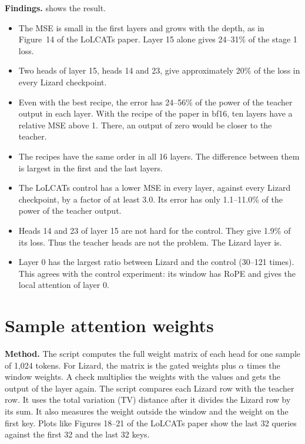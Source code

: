 \textbf{Findings.}  shows the result.
\begin{itemize}
\item The MSE is small in the first layers and grows with the depth, as in Figure~14 of the LoLCATs paper. Layer 15 alone gives 24--31\% of the stage 1 loss.
\item Two heads of layer 15, heads 14 and 23, give approximately 20\% of the loss in every Lizard checkpoint.
\item Even with the best recipe, the error has 24--56\% of the power of the teacher output in each layer. With the recipe of the paper in bf16, ten layers have a relative MSE above 1. There, an output of zero would be closer to the teacher.
\item The recipes have the same order in all 16 layers. The difference between them is largest in the first and the last layers.
\item The LoLCATs control has a lower MSE in every layer, against every Lizard checkpoint, by a factor of at least 3.0. Its error has only 1.1--11.0\% of the power of the teacher output.
\item Heads 14 and 23 of layer 15 are not hard for the control. They give 1.9\% of its loss. Thus the teacher heads are not the problem. The Lizard layer is.
\item Layer 0 has the largest ratio between Lizard and the control (30--121 times). This agrees with the control experiment: its window has RoPE and gives the local attention of layer 0.
\end{itemize}

\section{Sample attention weights}
\label{sec:xai-weights}

\textbf{Method.} The script  computes the full weight matrix of each head for one sample of 1,024 tokens. For Lizard, the matrix is the gated weights plus $\alpha$ times the window weights. A check multiplies the weights with the values and gets the output of the layer again. The script compares each Lizard row with the teacher row. It uses the total variation (TV) distance after it divides the Lizard row by its sum. It also measures the weight outside the window and the weight on the first key. Plots like Figures 18--21 of the LoLCATs paper show the last 32 queries against the first 32 and the last 32 keys.

